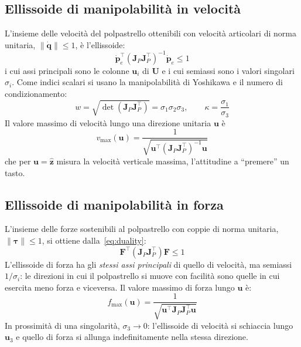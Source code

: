 \subsection{Ellissoide di manipolabilità in velocità}

L'insieme delle velocità del polpastrello ottenibili con velocità articolari di norma unitaria, $\|\dot{\boldsymbol q}\|\le 1$, è l'ellissoide:
\begin{equation}
    \dot{\boldsymbol p}_e^\top\left(\boldsymbol J_P\boldsymbol J_P^\top\right)^{-1}\dot{\boldsymbol p}_e\le 1
\end{equation}
i cui assi principali sono le colonne $\boldsymbol u_i$ di $\boldsymbol U$ e i cui semiassi sono i valori singolari $\sigma_i$. 
Come indici scalari si usano la manipolabilità di Yoshikawa e il numero di condizionamento:
\begin{equation}
    w=\sqrt{\det\left(\boldsymbol J_P\boldsymbol J_P^\top\right)}=\sigma_1\sigma_2\sigma_3,
    \qquad
    \kappa=\frac{\sigma_1}{\sigma_3}
\end{equation}
Il valore massimo di velocità lungo una direzione unitaria $\boldsymbol u$ è
\begin{equation}
    v_{\max}(\boldsymbol u)=\frac{1}{\sqrt{\boldsymbol u^\top(\boldsymbol J_P\boldsymbol J_P^\top)^{-1}\boldsymbol u}}
    \label{eq:vdir}
\end{equation}
che per $\boldsymbol u=\hat{\boldsymbol z}$ misura la velocità verticale massima, l'attitudine a “premere” un tasto.

\subsection{Ellissoide di manipolabilità in forza}

L'insieme delle forze sostenibili al polpastrello con coppie di norma unitaria, $\|\boldsymbol\tau\|\le 1$, si ottiene dalla~\eqref{eq:duality}:
\begin{equation}
    \boldsymbol F^\top\left(\boldsymbol J_P\boldsymbol J_P^\top\right)\boldsymbol F\le 1
\end{equation}
L'ellissoide di forza ha gli \emph{stessi assi principali} di quello di velocità, ma semiassi $1/\sigma_i$: le direzioni in cui il polpastrello si muove con facilità sono quelle in cui esercita meno forza e viceversa. 
Il valore massimo di forza lungo $\boldsymbol u$ è:
\begin{equation}
    f_{\max}(\boldsymbol u)=\frac{1}{\sqrt{\boldsymbol u^\top\boldsymbol J_P\boldsymbol J_P^\top\boldsymbol u}}
    \label{eq:fdir}
\end{equation}
In prossimità di una singolarità, $\sigma_3\to 0$: l'ellissoide di velocità si schiaccia lungo $\boldsymbol u_3$ e quello di forza si allunga indefinitamente nella stessa direzione.

